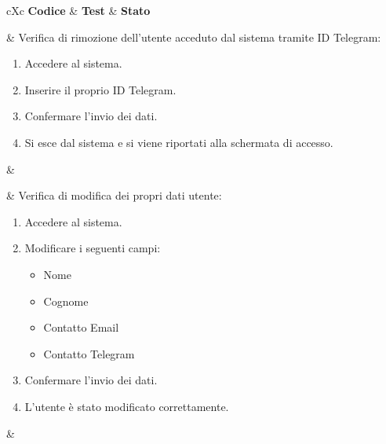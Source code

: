 \begin{table}[H]
	\begin{VTtable}[1.7]{\textwidth}{cXc}
		\rowcolor{\tablegray}
		\textbf{Codice} & \centering\textbf{Test} & \textbf{Stato} \\\toprule

        \addtotv & Verifica di rimozione dell'utente acceduto dal sistema tramite ID Telegram:
        \begin{enumerate}
            \item Accedere al sistema.
            \item Inserire il proprio ID Telegram.
            \item Confermare l'invio dei dati.
            \item Si esce dal sistema e si viene riportati alla schermata di accesso.
        \end{enumerate}
        & \TNI \\\midrule

        \addtotv & Verifica di modifica dei propri dati utente:
        \begin{enumerate}
            \item Accedere al sistema.
            \item Modificare i seguenti campi:
            \begin{itemize}
                \item Nome
                \item Cognome
                \item Contatto Email
                \item Contatto Telegram
            \end{itemize}
            \item Confermare l'invio dei dati.
            \item L'utente è stato modificato correttamente.
        \end{enumerate}
        & \TNI \\\midrule


\end{VTtable}
\end{table}
